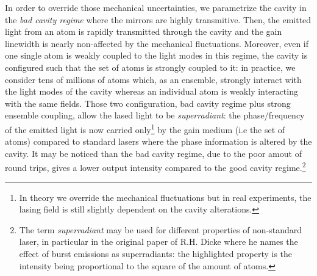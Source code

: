 \documentclass[10pt]{report}
\begin{document}
In order to override those mechanical uncertainties, we parametrize the cavity in the \textit{bad cavity regime} where the mirrors are highly transmitive. Then, the emitted light from an atom is rapidly transmitted through the cavity and the gain linewidth is nearly non-affected by the mechanical fluctuations. Moreover, even if one single atom is weakly coupled to the light modes in this regime, the cavity is configured such that the set of atoms is strongly coupled to it: in practice, we consider tens of millions of atoms which, as an ensemble, strongly interact with the light modes of the cavity whereas an individual atom is weakly interacting with the same fields. Those two configuration, bad cavity regime plus strong ensemble coupling, allow the lased light to be \textit{superradiant}: the phase/frequency of the emitted light is now carried only\footnote{In theory we override the mechanical fluctuations but in real experiments, the lasing field is still slightly dependent on the cavity alterations.} by the gain medium (i.e the set of atoms) compared to standard lasers where the phase information is altered by the cavity. It may be noticed than the bad cavity regime, due to the poor amout of round trips, gives a lower output intensity compared to the good cavity regime.\footnote{The term \textit{superradiant} may be used for different properties of non-standard laser, in particular in the original paper of R.H. Dicke where he names the effect of burst emissions as superradiants: the highlighted property is the intensity being proportional to the square of the amount of atoms.}
\end{document}
